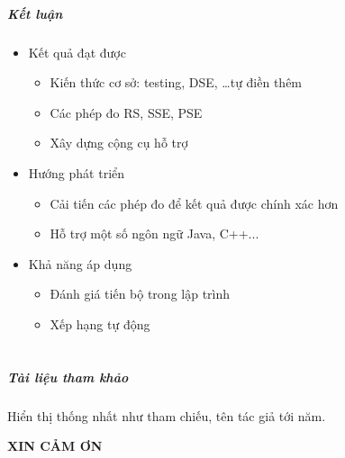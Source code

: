 \documentclass{beamer}
\begin{document}
\begin{frame}
  \frametitle{Kết luận}
	
  \begin{itemize}
  	\item Kết quả đạt được 
  	\begin{itemize}
  		\item Kiến thức cơ sở: testing, DSE, \dots tự điền thêm
  		\item Các phép đo RS, SSE, PSE
  		\item Xây dựng cộng cụ hỗ trợ
  	\end{itemize} \pause
  	\item Hướng phát triển
  	\begin{itemize}
  		\item Cải tiến các phép đo để kết quả được chính xác hơn
  		\item Hỗ trợ một số ngôn ngữ Java, C++...
  	\end{itemize} \pause
  	\item Khả năng áp dụng
  	\begin{itemize}
  		\item Đánh giá tiến bộ trong lập trình
  		\item Xếp hạng tự động
  	\end{itemize}
  \end{itemize}
\end{frame}


\part{}

\begin{frame}
  \frametitle{Tài liệu tham khảo}
 Hiển thị thống nhất như tham chiếu, tên tác giả tới năm. 
  
  {\footnotesize}
\end{frame}


\begin{frame}
  \begin{center}
    \begin{Huge}
      \textcolor{BlueGreen}{\textbf{XIN CẢM ƠN}}
    \end{Huge}
\end{center}

\end{frame}

\end{document}
